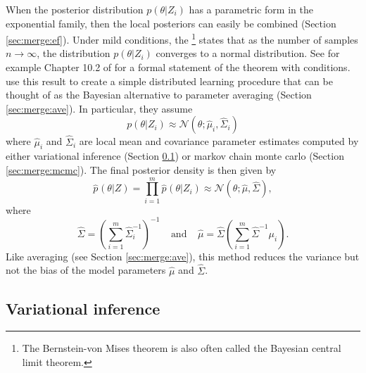 \documentclass[thesis.tex]{subfiles}
\newcommand{\p}[1]{p\left({#1}\right)}
\newcommand{\psup}[2]{\hat p^{#1}({#2})}
\newcommand{\phat}[1]{\psup{}{#1}}
\newcommand{\gaussian}[3]{\mathcal N({#1};{#2},{#3})}
\begin{document}
When the posterior distribution $p(\theta|Z_i)$ has a parametric form in the exponential family,
then the local posteriors can easily be combined (Section \ref{sec:merge:ef}).
Under mild conditions, the \footnote{
    The Bernstein-von Mises theorem is also often called the Bayesian central limit theorem.
}
states that as the number of samples $n\to\infty$,
the distribution $p(\theta|Z_i)$ converges to a normal distribution. 
See for example Chapter 10.2 of \cite{vandervaart1998asymptotic} for a formal statement of the theorem with conditions.
\cite{neiswanger2014asymptotically} use this result to create a simple distributed learning procedure that can be thought of as the Bayesian alternative to parameter averaging (Section \ref{sec:merge:ave}). 
%
In particular, they assume
\begin{equation}
    \p{\theta | Z_i}
    \approx
    \gaussian{\theta}{\hat\mu_i}{\hat\Sigma_i}
\end{equation}
where $\hat\mu_i$ and $\hat\Sigma_i$ are local mean and covariance parameter estimates computed by either variational inference (Section \ref{sec:merge:vi}) or markov chain monte carlo (Section \ref{sec:merge:mcmc}).
The final posterior density is then given by
\begin{equation}
    \phat{\theta | Z}
    =
    \prod_{i=1}^m
    \phat{\theta | Z_i}
    \approx
    \gaussian{\theta}{\hat\mu}{\hat\Sigma}
    ,
\end{equation}
where
\begin{equation}
    \hat\Sigma
    =
    \left(
        \sum_{i=1}^m
        \hat\Sigma_i^{-1}
    \right)^{-1}
    ~~~~~\text{and}~~~~~
    \hat\mu
    =
    \hat\Sigma \left(\sum_{i=1}^m \hat\Sigma^{-1} \mu_i \right)
    .
\end{equation}
Like averaging (see Section \ref{sec:merge:ave}),
this method reduces the variance but not the bias of the model parameters $\hat\mu$ and $\hat\Sigma$.


\subsection{Variational inference}
\label{sec:merge:vi}
\end{document}

